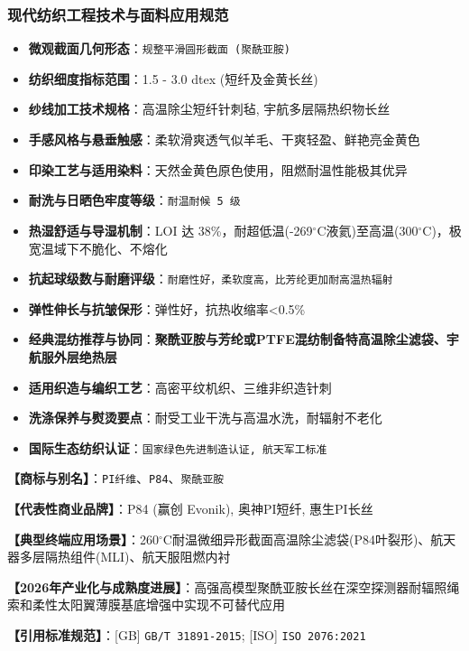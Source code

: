 \documentclass[11pt,openright,twoside,UTF8]{ctexbook}
\begin{document}
\subsubsection*{现代纺织工程技术与面料应用规范}
\begin{itemize} \setlength{\itemsep}{2pt}
    \item \textbf{微观截面几何形态}：\texttt{规整平滑圆形截面 (聚酰亚胺)}
    \item \textbf{纺织细度指标范围}：1.5 - 3.0 dtex (短纤及金黄长丝)
    \item \textbf{纱线加工技术规格}：高温除尘短纤针刺毡, 宇航多层隔热织物长丝
    \item \textbf{手感风格与悬垂触感}：柔软滑爽透气似羊毛、干爽轻盈、鲜艳亮金黄色
    \item \textbf{印染工艺与适用染料}：天然金黄色原色使用，阻燃耐温性能极其优异
    \item \textbf{耐洗与日晒色牢度等级}：\texttt{耐温耐候 5 级}
    \item \textbf{热湿舒适与导湿机制}：LOI 达 38\%，耐超低温(-269$^\circ\mathrm{C}$液氦)至高温(300$^\circ\mathrm{C}$)，极宽温域下不脆化、不熔化
    \item \textbf{抗起球级数与耐磨评级}：\texttt{耐磨性好，柔软度高，比芳纶更加耐高温热辐射}
    \item \textbf{弹性伸长与抗皱保形}：弹性好，抗热收缩率\textless{}0.5\%
    \item \textbf{经典混纺推荐与协同}：\textbf{聚酰亚胺与芳纶或PTFE混纺制备特高温除尘滤袋、宇航服外层绝热层}
    \item \textbf{适用织造与编织工艺}：高密平纹机织、三维非织造针刺
    \item \textbf{洗涤保养与熨烫要点}：耐受工业干洗与高温水洗，耐辐射不老化
    \item \textbf{国际生态纺织认证}：\texttt{国家绿色先进制造认证, 航天军工标准}
\end{itemize}
\vspace{0.2cm}

\noindent\textbf{【商标与别名】}：\texttt{PI纤维}、\texttt{P84}、\texttt{聚酰亚胺}\par
\noindent\textbf{【代表性商业品牌】}：P84 (赢创 Evonik), 奥神PI短纤, 惠生PI长丝\par
\noindent\textbf{【典型终端应用场景】}：260$^\circ\mathrm{C}$耐温微细异形截面高温除尘滤袋(P84叶裂形)、航天器多层隔热组件(MLI)、航天服阻燃内衬\par
\noindent\textbf{【2026年产业化与成熟度进展】}：高强高模型聚酰亚胺长丝在深空探测器耐辐照绳索和柔性太阳翼薄膜基底增强中实现不可替代应用\par
\noindent\textbf{【引用标准规范】}：[GB] \texttt{GB/T 31891-2015}; [ISO] \texttt{ISO 2076:2021}\par
\vspace{0.5cm}
\end{document}

